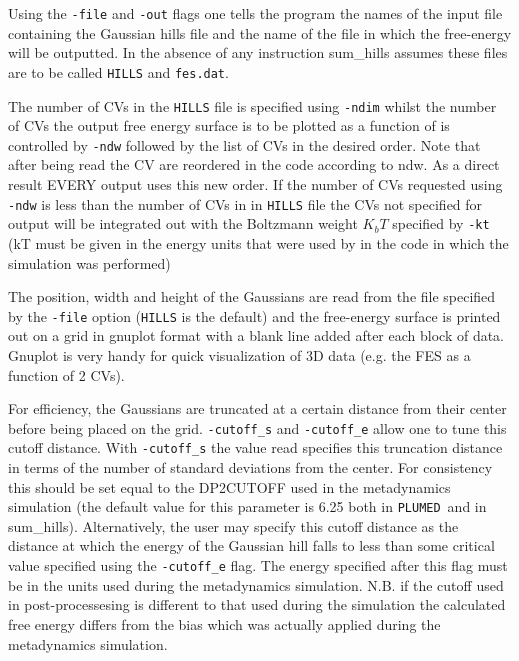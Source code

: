 \documentclass[12pt,fleqn]{report}
\newcommand{\plumed}{{\tt PLUMED}}
\begin{document}
Using the {\tt -file} and {\tt -out} flags one tells the program the names
of the input file containing the Gaussian hills file and the name of the 
file in which the free-energy will be outputted.
  In the absence of any instruction sum\_hills assumes these files are
  to be called {\tt HILLS} and {\tt fes.dat}.

The number of CVs in the {\tt HILLS} file is specified using 
{\tt -ndim} whilst the number of CVs the output free energy surface is to be plotted as a function of is controlled by
{\tt -ndw} followed by the list of CVs in the desired order. Note that after
being read the CV are reordered in the code according to ndw. As a direct result EVERY output uses this new order. 
If the number of CVs requested using {\tt -ndw} is less than the number of CVs in 
in {\tt HILLS} file the CVs not specified for output will be
integrated out with the Boltzmann weight $K_bT$ specified by {\tt -kt} 
(kT must be given in the energy units that were used by in the code in which the simulation was performed) 

The position, width and height of the Gaussians are read from the file
specified by the {\tt -file} option ({\tt HILLS} is the default) and the
free-energy surface is printed out on a grid in gnuplot format with a
blank line added after each block of data. Gnuplot is very
handy for quick visualization of 3D data (e.g. the FES as a function of 2 CVs).

For efficiency, the Gaussians are truncated at a certain distance from 
their center before being placed on the grid.
{\tt -cutoff\_s} and {\tt -cutoff\_e} allow one to tune this cutoff distance.
With {\tt -cutoff\_s} the value read specifies this truncation distance in terms of the number of
standard deviations from the center.  For consistency this should be set equal to the DP2CUTOFF
used in the metadynamics simulation (the default value for this parameter is 6.25 both in \plumed \ and in sum\_hills). 
  Alternatively, the user may specify this cutoff distance as the distance at which the energy of the Gaussian hill falls to less 
than some critical value specified using the {\tt -cutoff\_e} flag.  The energy specified after this flag must be in the
units used during the metadynamics simulation.  N.B. if the cutoff used in post-processesing 
is different to that used during the simulation the calculated free energy differs from the bias which was actually applied during
the metadynamics simulation.

\end{document}
